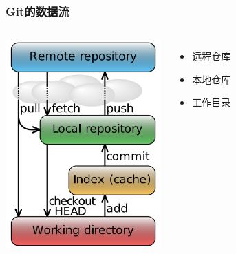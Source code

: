 \begin{frame}
    \frametitle{Git的数据流}
    \begin{columns}
        \column{6.0cm}
            \includegraphics[height=8cm,keepaspectratio]{data/GitDataFlowSimplified.png}
            \label{pic:DataFlow}
        \column{4.5cm}
            \begin{itemize}
                \item 远程仓库
                \item 本地仓库
                \item 工作目录
            \end{itemize}
    \end{columns}
\end{frame}


